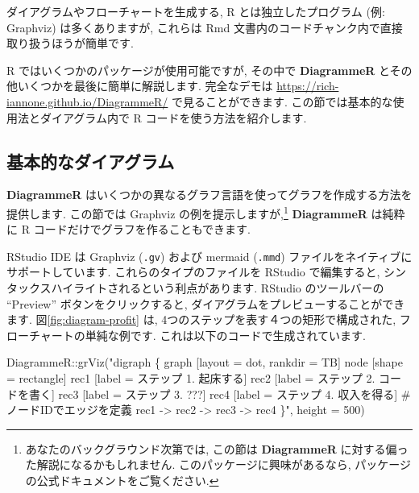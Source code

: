 \documentclass[
  11pt,
  lualatex,
  ja=standard]{bxjsreport}
\newenvironment{Shaded}{\begin{snugshade}}{\end{snugshade}}
\newcommand{\AttributeTok}[1]{\textcolor[rgb]{0.77,0.63,0.00}{#1}}
\newcommand{\DecValTok}[1]{\textcolor[rgb]{0.00,0.00,0.81}{#1}}
\newcommand{\FunctionTok}[1]{\textcolor[rgb]{0.00,0.00,0.00}{#1}}
\newcommand{\NormalTok}[1]{#1}
\newcommand{\SpecialCharTok}[1]{\textcolor[rgb]{0.00,0.00,0.00}{#1}}
\newcommand{\StringTok}[1]{\textcolor[rgb]{0.31,0.60,0.02}{#1}}
\begin{document}
ダイアグラムやフローチャートを生成する, R とは独立したプログラム (例: Graphviz) は多くありますが, これらは Rmd 文書内のコードチャンク内で直接取り扱うほうが簡単です.

R ではいくつかのパッケージが使用可能ですが, その中で \textbf{DiagrammeR} \autocite{R-DiagrammeR} とその他いくつかを最後に簡単に解説します. 完全なデモは \url{https://rich-iannone.github.io/DiagrammeR/} で見ることができます. この節では基本的な使用法とダイアグラム内で R コードを使う方法を紹介します.

\hypertarget{basic-diagrams}{%
\subsection{基本的なダイアグラム}\label{basic-diagrams}}

\textbf{DiagrammeR} はいくつかの異なるグラフ言語を使ってグラフを作成する方法を提供します. この節では Graphviz の例を提示しますが,\footnote{あなたのバックグラウンド次第では, この節は \textbf{DiagrammeR} に対する偏った解説になるかもしれません. このパッケージに興味があるなら, パッケージの公式ドキュメントをご覧ください.} \textbf{DiagrammeR} は純粋に R コードだけでグラフを作ることもできます.

RStudio IDE は Graphviz (\texttt{.gv}) および mermaid (\texttt{.mmd}) ファイルをネイティブにサポートしています. これらのタイプのファイルを RStudio で編集すると, シンタックスハイライトされるという利点があります. RStudio のツールバーの ``Preview'' ボタンをクリックすると, ダイアグラムをプレビューすることができます. 図\ref{fig:diagram-profit} は, 4つのステップを表す４つの矩形で構成された, フローチャートの単純な例です. これは以下のコードで生成されています.

\begin{Shaded}
\begin{Highlighting}[numbers=left,,]
\NormalTok{DiagrammeR}\SpecialCharTok{::}\FunctionTok{grViz}\NormalTok{(}\StringTok{"digraph \{}
\StringTok{  graph [layout = dot, rankdir = TB]}
\StringTok{  }
\StringTok{  node [shape = rectangle]        }
\StringTok{  rec1 [label = \textquotesingle{}ステップ 1. 起床する\textquotesingle{}]}
\StringTok{  rec2 [label = \textquotesingle{}ステップ 2. コードを書く\textquotesingle{}]}
\StringTok{  rec3 [label = \textquotesingle{}ステップ 3. ???\textquotesingle{}]}
\StringTok{  rec4 [label = \textquotesingle{}ステップ 4. 収入を得る\textquotesingle{}]}
\StringTok{  }
\StringTok{  \# ノードIDでエッジを定義}
\StringTok{  rec1 {-}\textgreater{} rec2 {-}\textgreater{} rec3 {-}\textgreater{} rec4}
\StringTok{  \}"}\NormalTok{, }
  \AttributeTok{height =} \DecValTok{500}\NormalTok{)}
\end{Highlighting}
\end{Shaded}
\end{document}
